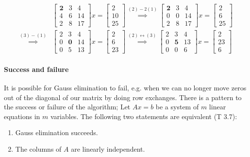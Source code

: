 \vspace{-\baselineskip}

\begin{align*}
    &\begin{bmatrix} \mathbf{2} & 3 & 4 \\ 4 & 6 & 14 \\ 2 & 8 & 17 \end{bmatrix}
    x
    =
    \begin{bmatrix} 2 \\ 10 \\ 25 \end{bmatrix}
    \stackrel{(2)-2(1)}{\implies}
    \begin{bmatrix} \mathbf{2} & 3 & 4 \\ 0 & 0 & 14 \\ 2 & 8 & 17 \end{bmatrix}
    x
    =
    \begin{bmatrix} 2 \\ 6 \\ 25 \end{bmatrix}
    \\
    \stackrel{(3)-(1)}{\implies}
    &\begin{bmatrix} 2 & 3 & 4 \\ 0 & \mathbf{0} & 14 \\ 0 & 5 & 13 \end{bmatrix}
    x
    =
    \begin{bmatrix} 2 \\ 6 \\ 23 \end{bmatrix}
    \stackrel{(2)\mathbin{\leftrightarrow}(3)}{\implies}
    \begin{bmatrix} 2 & 3 & 4 \\ 0 & \mathbf{5} & 13 \\ 0 & 0 & 6 \end{bmatrix}
    x
    =
    \begin{bmatrix} 2 \\ 23 \\ 6 \end{bmatrix}
\end{align*}

\paragraph{Success and failure} It is possible for Gauss
elimination to fail, e.g. when we can no longer move
zeros out of the diagonal of our matrix by doing row exchanges. 
There is a pattern to the success or failure of the algorithm;
Let $Ax=b$ be a system of $m$ linear equations in $m$ variables.
The following two statements are equivalent (T 3.7):
\begin{enumerate}
    \item Gauss elimination succeeds.
    \item The columns of $A$ are linearly independent.
\end{enumerate}

